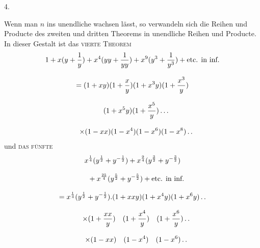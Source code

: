 \par\medskip{}\centerline{4.}\nobreak\smallskip
Wenn man $n$ ins unendliche wachsen lässt, so verwandeln sich die Reihen und Producte des zweiten und dritten Theorems in unendliche Reihen und Producte. In dieser Gestalt ist das \textsc{vierte Theorem}
\[
\begin{gathered}
1+x(y+\frac1y)+x^4(yy+\frac1{yy})+x^9(y^3+\frac1{y^3})+\text{etc. in inf.}\\[8pt]
=(1+xy)(1+\frac xy)(1+x^3y)(1+\frac{x^3}y)\\[8pt]\quad{}(1+x^5y)(1+\frac{x^5}y)\mathinner{.\,.\,.}\\[8pt]
\quad\times(1-xx)(1-x^4)(1-x^6)(1-x^8)\mathinner{.\,.}
\end{gathered}
\]
und \textsc{das fünfte}
\[
\begin{gathered}
x^{\frac14}(y^{\frac12}+y^{-\frac12})+x^{\frac94}(y^{\frac32}+y^{-\frac32})\\[8pt]\quad{}+x^{\frac{25}4}(y^{\frac52}+y^{-\frac52})+\text{etc. in inf.}\\[8pt]
=x^{\frac14}(y^{\frac12}+y^{-\frac12}).(1+xxy)(1+x^4y)(1+x^6y)\mathinner{.\,.}\\[8pt]
\quad\times(1+\frac{xx}y)\quad(1+\frac{x^4}y)\quad(1+\frac{x^6}y)\mathinner{.\,.}\\[8pt]
\quad\times(1-xx)\quad(1-x^4)\quad(1-x^6)\mathinner{.\,.}
\end{gathered}
\]


